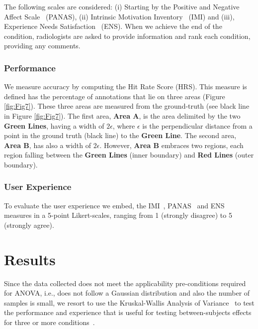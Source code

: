 \documentclass{chi-ext}
\begin{document}
The following scales are considered: (i) Starting by the Positive and Negative Affect Scale~\cite{watson1999panas} (PANAS), (ii) Intrinsic Motivation Inventory~\cite{ryan1982control} (IMI) and (iii), Experience Needs Satisfaction~\cite{broeck2010capturing} (ENS). When we achieve the end of the condition, radiologists are asked to provide information and rank each condition, providing any comments.

\subsubsection{Performance}

We measure accuracy by computing the Hit Rate Score (HRS). This measure is defined has the percentage of annotations that lie on three areas (Figure \ref{fig:Fig7}). These three areas are measured from the ground-truth (see black line in Figure \ref{fig:Fig7}). The first area, \textbf{Area A}, is the area delimited by the two \textbf{Green Lines}, having a width of $2\epsilon$, where $\epsilon$ is the perpendicular distance from a point in the ground truth (black line) to the \textbf{Green Line}\footnotemark. The second area, \textbf{Area B}, has also a width of $2\epsilon$. However,  \textbf{Area B} embraces two regions, each region falling between the \textbf{Green Lines} (inner boundary) and \textbf{Red Lines} (outer boundary).


\vfil

\subsubsection{User Experience}

To evaluate the user experience we embed, the IMI~\cite{ryan1982control}, PANAS~\cite{watson1999panas}
and ENS~\cite{broeck2010capturing} measures in a 5-point Likert-scales,  ranging from 1 (strongly disagree) to 5 (strongly agree).

\section{Results}

Since the data collected does not meet the applicability pre-conditions required for ANOVA, i.e., does not follow a Gaussian distribution and also the number of samples is small, we resort to use the Kruskal-Wallis Analysis of Variance~\cite{theodorsson1986kruskal} to test the performance and experience that is useful for testing between-subjects effects for three or more conditions~\cite{mcfarlane2002comparison}.
\end{document}
